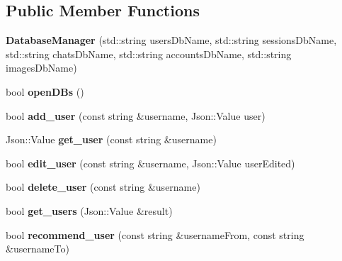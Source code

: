 \subsection*{Public Member Functions}
\begin{DoxyCompactItemize}
\item 
{\bfseries Database\+Manager} (std\+::string users\+Db\+Name, std\+::string sessions\+Db\+Name, std\+::string chats\+Db\+Name, std\+::string accounts\+Db\+Name, std\+::string images\+Db\+Name)\hypertarget{classDatabaseManager_a00cc2fc74ad1e3c84d3947dbf1e71655}{}\label{classDatabaseManager_a00cc2fc74ad1e3c84d3947dbf1e71655}

\item 
bool {\bfseries open\+D\+Bs} ()\hypertarget{classDatabaseManager_afc0cbe21c6f41f9272f63768f7109390}{}\label{classDatabaseManager_afc0cbe21c6f41f9272f63768f7109390}

\item 
bool {\bfseries add\+\_\+user} (const string \&username, Json\+::\+Value user)\hypertarget{classDatabaseManager_ad35907af8667e72c8342b32084ee9b0e}{}\label{classDatabaseManager_ad35907af8667e72c8342b32084ee9b0e}

\item 
Json\+::\+Value {\bfseries get\+\_\+user} (const string \&username)\hypertarget{classDatabaseManager_a855c704a9dc45e43275e11b539c210db}{}\label{classDatabaseManager_a855c704a9dc45e43275e11b539c210db}

\item 
bool {\bfseries edit\+\_\+user} (const string \&username, Json\+::\+Value user\+Edited)\hypertarget{classDatabaseManager_a70cd1cf1744913ef018b93a0524390ec}{}\label{classDatabaseManager_a70cd1cf1744913ef018b93a0524390ec}

\item 
bool {\bfseries delete\+\_\+user} (const string \&username)\hypertarget{classDatabaseManager_a70178ca9f4e05bdef4909ae71874f983}{}\label{classDatabaseManager_a70178ca9f4e05bdef4909ae71874f983}

\item 
bool {\bfseries get\+\_\+users} (Json\+::\+Value \&result)\hypertarget{classDatabaseManager_a23bdd4b0f7dd70d478ea298c715768c1}{}\label{classDatabaseManager_a23bdd4b0f7dd70d478ea298c715768c1}

\item 
bool {\bfseries recommend\+\_\+user} (const string \&username\+From, const string \&username\+To)\hypertarget{classDatabaseManager_a977dad3acba2da5446d4e7ab3c84e5b7}{}\label{classDatabaseManager_a977dad3acba2da5446d4e7ab3c84e5b7}


\end{DoxyCompactItemize}
